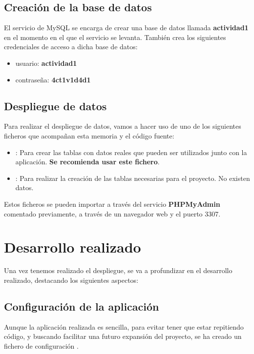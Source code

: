 \documentclass{\ClassPath/viu-tfm-template}
\begin{document}
\section{Creación de la base de datos}

El servicio de MySQL se encarga de crear una base de datos llamada \textbf{actividad1} en el momento en el que el servicio se levanta. También crea los siguientes credenciales de acceso a dicha base de datos:

\vspace{-1em}
\begin{itemize}
    \item usuario:  \textbf{actividad1}
    \item contraseña:  \textbf{4ct1v1d4d1}
\end{itemize}
\vspace{-1em}

\section{Despliegue de datos}
Para realizar el despliegue de datos, vamos a hacer uso de uno de los siguientes ficheros que acompañan esta memoria y el código fuente:

\vspace{-1em}
\begin{itemize}
    \item {}: Para crear las tablas con datos reales que pueden ser utilizados junto con la aplicación. \textbf{Se recomienda usar este fichero}.
    \item {}: Para realizar la creación de las tablas necesarias para el proyecto. No existen datos.
\end{itemize}
\vspace{-1em}

Estos ficheros se pueden importar a través del servicio \textbf{PHPMyAdmin} comentado previamente, a través de un navegador web y el puerto 3307.


\chapter{Desarrollo realizado}

Una vez tenemos realizado el despliegue, se va a profundizar en el desarrollo realizado, destacando los siguientes aspectos:

\section{Configuración de la aplicación}
Aunque la aplicación realizada es sencilla, para evitar tener que estar repitiendo código, y buscando facilitar una futuro expansión del proyecto, se ha creado un fichero de configuración .
\end{document}
